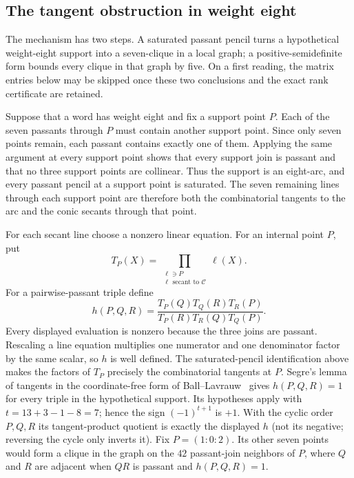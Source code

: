 \documentclass[11pt]{article}
\theoremstyle{definition}
\theoremstyle{remark}
\newcommand{\cC}{\mathcal C}
\begin{document}
\subsection{The tangent obstruction in weight eight}

The mechanism has two steps.  A saturated passant pencil turns a hypothetical
weight-eight support into a seven-clique in a local graph; a
positive-semidefinite form bounds every clique in that graph by five.  On a
first reading, the matrix entries below may be skipped once these two conclusions
and the exact rank certificate are retained.

Suppose that a word has weight eight and fix a support point \(P\).  Each of
the seven passants through \(P\) must contain another support point.  Since
only seven points remain, each passant contains exactly one of them.  Applying
the same argument at every support point shows that every support join is
passant and that no three support points are collinear.  Thus the support is
an eight-arc, and every passant pencil at a support point is saturated.  The
seven remaining lines through each support point are therefore both the
combinatorial tangents to the arc and the conic secants through that point.

For each secant line choose a nonzero linear equation.  For an internal point
\(P\), put
\[
 T_P(X)=\prod_{\substack{\ell\ni P\\
                    \ell\text{ secant to }\cC}}\ell(X).
\]
For a pairwise-passant triple define
\[
 h(P,Q,R)=
 \frac{T_P(Q)T_Q(R)T_R(P)}
      {T_P(R)T_R(Q)T_Q(P)}.
\]
Every displayed evaluation is nonzero because the three joins are passant.
Rescaling a line equation multiplies one numerator and one denominator factor
by the same scalar, so \(h\) is well defined.  The saturated-pencil
identification above makes the factors of \(T_P\) precisely the combinatorial
tangents at \(P\).
Segre's lemma of tangents in the coordinate-free form of
Ball--Lavrauw~\cite[Lemma~27]{BallLavrauw2019} gives
\(h(P,Q,R)=1\) for every triple in the hypothetical support.  Its hypotheses
apply with \(t=13+3-1-8=7\); hence the sign
\((-1)^{t+1}\) is \(+1\).  With
the cyclic order \(P,Q,R\) its tangent-product quotient is exactly the
displayed \(h\) (not its negative; reversing the cycle only inverts it).  Fix
\(P=(1:0:2)\).  Its other seven points would form a clique in the graph on
the \(42\) passant-join neighbors of \(P\), where \(Q\) and \(R\) are
adjacent when \(QR\) is passant and \(h(P,Q,R)=1\).
\end{document}
